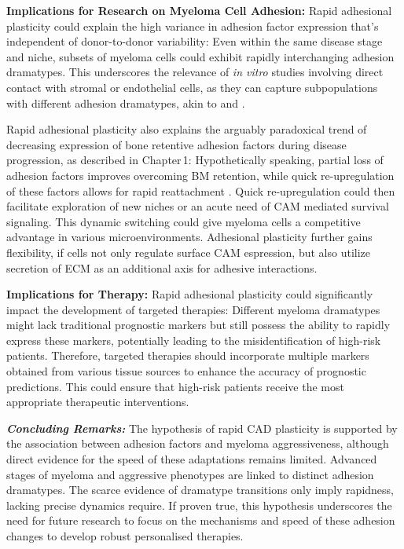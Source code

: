 \textbf{Implications for Research on Myeloma Cell Adhesion:}
Rapid adhesional plasticity could explain the high variance in adhesion factor
expression that's independent of donor-to-donor variability: Even within the
same disease stage and niche, subsets of myeloma cells could exhibit rapidly
interchanging adhesion dramatypes. This underscores the relevance of \textit{in
      vitro} studies involving direct contact with stromal or endothelial cells, as
they can capture subpopulations with different adhesion dramatypes, akin to
\MAina and \nMAina.

Rapid adhesional plasticity also explains the arguably paradoxical trend of
decreasing expression of bone retentive adhesion
factors during disease progression, as
described in Chapter\,1: Hypothetically speaking, partial loss of adhesion
factors improves overcoming \ac{BM} retention, while quick re-upregulation of
these factors allows for rapid reattachment . Quick
re-upregulation could then facilitate exploration of new niches or an acute need
of \ac{CAM} mediated survival signaling. This dynamic switching could give
myeloma cells a competitive advantage in various microenvironments. Adhesional
plasticity further gains flexibility, if cells not only regulate surface
\ac{CAM} espression, but also utilize secretion of \ac{ECM} as an additional
axis for adhesive interactions.



\textbf{Implications for Therapy:}
Rapid adhesional plasticity could significantly impact the development of
targeted therapies: Different myeloma dramatypes might lack traditional
prognostic markers but still possess the ability to rapidly express these
markers, potentially leading to the misidentification of high-risk patients.
Therefore, targeted therapies should incorporate multiple markers obtained from
various tissue sources to enhance the accuracy of prognostic predictions. This
could ensure that high-risk patients receive the most appropriate therapeutic
interventions.



\textbf{\textit{Concluding Remarks:}} The hypothesis of rapid \ac{CAD}
plasticity is supported by the association between adhesion factors and myeloma
aggressiveness, although direct evidence for the speed of these adaptations
remains limited. Advanced stages of myeloma and aggressive phenotypes are linked
to distinct adhesion dramatypes. The scarce evidence of dramatype transitions
only imply rapidness, lacking precise dynamics require. If proven true, this
hypothesis underscores the need for future research to focus on the mechanisms
and speed of these adhesion changes to develop robust personalised therapies.




